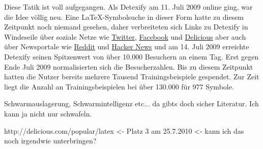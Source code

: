 Diese Tatik ist voll aufgegangen. Als Detexify am 11. Juli 2009 online ging, war die Idee völlig neu. Eine \LaTeX-Symbolsuche in dieser Form hatte zu diesem Zeitpunkt noch niemand gesehen, daher verbreiteten sich Links zu Detexify in Windeseile über soziale Netze wie \href{http://twitter.com}{Twitter}, \href{http://facebook.com}{Facebook} und \href{http://delicious.com}{Delicious} aber auch über Newsportale wie \href{http://reddit.com}{Reddit} und \href{http://news.ycombinator.com}{Hacker News} und am 14. Juli 2009 erreichte Detexify seinen Spitzenwert von über 10.000 Besuchern an einem Tag. Erst gegen Ende Juli 2009 normalisierten sich die Besucherzahlen. Bis zu diesem Zeitpunkt hatten die Nutzer bereits mehrere Tausend Trainingsbeispiele gespendet. Zur Zeit liegt die Anzahl an Trainingsbeispielen bei über 130.000 für 977 Symbole.

\TODO Schwarmauslagerung, Schwarmintelligenz etc... da gibts doch sicher Literatur. Ich kann ja nicht nur schwafeln.

\TODO http://delicious.com/popular/latex <- Platz 3 am 25.7.2010 <- kann ich das noch irgendwie unterbringen?



